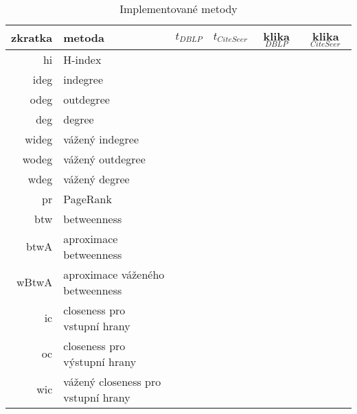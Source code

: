 \documentclass[12pt,titlepage]{report}
\begin{document}
\begin{table}[!ht]
\begin{center}
\begin{tabular}{r|l|c|c|c|c}
\toprule
zkratka & metoda & $t_{DBLP}$ & $t_{CiteSeer}$ & klika$_{DBLP}$\footnotemark & klika$_{CiteSeer}$\footnotemark \\
\midrule
hi    & H-index                            \\
ideg  & indegree                           \\
odeg  & outdegree                          \\
deg   & degree                             \\
wideg & vážený indegree                    \\
wodeg & vážený outdegree                   \\
wdeg  & vážený degree                      \\
pr    & PageRank                           \\
btw   & betweenness                        \\
btwA  & aproximace betweenness             \\
wBtwA & aproximace váženého betweenness    \\
ic    & closeness pro vstupní hrany        \\
oc    & closeness pro výstupní hrany       \\
wic   & vážený closeness pro vstupní hrany \\
\bottomrule
\end{tabular}
\end{center}
\caption{Implementované metody}
\label{tab:impmetody}
\end{table}


\end{document}
